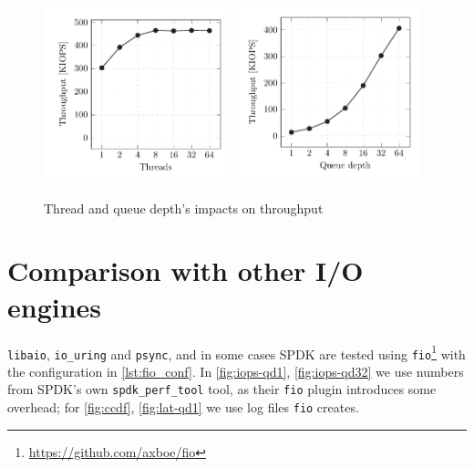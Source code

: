 \begin{figure}
  \centering
   {\includegraphics[width=0.48\textwidth]{figures/vroom-iops-thread-qd32} \label{fig:vroom-iops-thread-qd32}}
   {\includegraphics[width=0.48\textwidth]{figures/vroom-iops-qd} \label{fig:vroom-iops-qd}}
  \caption{Thread and queue depth's impacts on throughput}
  \label{fig:vroom-thread-qd}
\end{figure}


\section{Comparison with other I/O engines}
\texttt{libaio}, \texttt{io\_uring} and \texttt{psync}, and in some cases SPDK are tested using \texttt{fio}\footnote{\url{https://github.com/axboe/fio}} with the configuration in \autoref{lst:fio_conf}. In \autoref{fig:iops-qd1}, \autoref{fig:iops-qd32} we use numbers from SPDK's own \texttt{spdk\_perf\_tool} tool, as their \texttt{fio} plugin introduces some overhead; for \autoref{fig:ccdf}, \autoref{fig:lat-qd1} we use log files \texttt{fio} creates.

